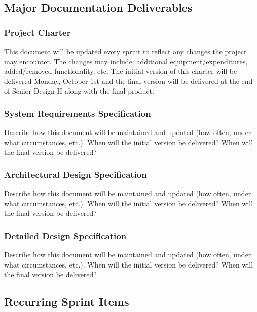 
\subsection{Major Documentation Deliverables}

\subsubsection{Project Charter}
This document will be updated every sprint to reflect any changes the project may encounter. The changes may include: additional equipment/expenditures, added/removed functionality, etc. The initial version of this charter will be delivered Monday, October 1st and the final version will be delivered at the end of Senior Design II along with the final product.

\subsubsection{System Requirements Specification}
Describe how this document will be maintained and updated (how often, under what circumstances, etc.). When will the initial version be delivered? When will the final version be delivered?

\subsubsection{Architectural Design Specification}
Describe how this document will be maintained and updated (how often, under what circumstances, etc.). When will the initial version be delivered? When will the final version be delivered?

\subsubsection{Detailed Design Specification}
Describe how this document will be maintained and updated (how often, under what circumstances, etc.). When will the initial version be delivered? When will the final version be delivered?

\subsection{Recurring Sprint Items}

